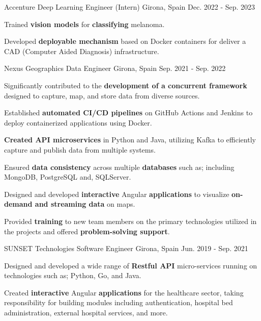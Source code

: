 \begin{cventries}
    \cventry
    {Accenture} %
    {Deep Learning Engineer (Intern)} %
    {Girona, Spain} %
    {Dec. 2022 - Sep. 2023} %
    {
    \begin{cvitems}
    \item {Trained \textbf{vision models} for \textbf{classifying} melanoma.}
    \item {Developed \textbf{deployable mechanism} based on Docker containers for
        deliver a CAD (Computer Aided Diagnosis) infrastructure.}
    \end{cvitems}
    }

      \cventry
      {Nexus Geographics} %
      {Data Engineer} %
      {Girona, Spain} %
      {Sep. 2021 - Sep. 2022} %
      {
        \begin{cvitems}
        \item {Significantly contributed to the \textbf{development of a concurrent framework} designed to capture,
          map, and store data from diverse sources.}
        \item {Established \textbf{automated CI/CD pipelines} on GitHub Actions and Jenkins
          to deploy containerized applications using Docker.}
        \item {\textbf{Created API microservices} in Python and Java,
          utilizing Kafka to efficiently capture and publish data from multiple systems.}
        \item {Ensured \textbf{data consistency} across multiple \textbf{databases} such as;
          including MongoDB, PostgreSQL and, SQLServer.}
        \item {Designed and developed \textbf{interactive} Angular
          \textbf{applications} to visualize \textbf{on-demand and streaming data} on maps.}
        \item {Provided \textbf{training} to new team
          members on the primary technologies utilized in the projects and offered \textbf{problem-solving support}.}
        \end{cvitems}
      }


      \cventry
      {SUNSET Technologies} %
      {Software Engineer} %
      {Girona, Spain} %
      {Jun. 2019 - Sep. 2021} %
      {
        \begin{cvitems}
        \item {Designed and developed a wide range of \textbf{Restful API} micro-services
          running on technologies such as; Python, Go, and Java.}
        \item {Created \textbf{interactive} Angular \textbf{applications} for the healthcare sector,
          taking responsibility for building modules including authentication,
          hospital bed administration, external hospital services, and more.}
        \end{cvitems}
      }

  \end{cventries}
